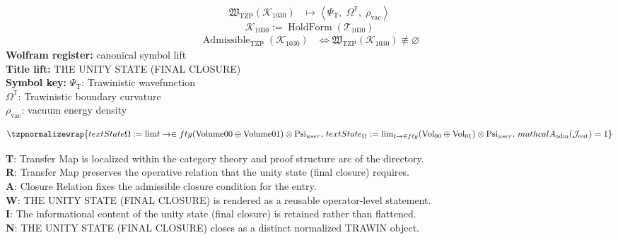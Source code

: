 \noindent
\begin{minipage}[t]{0.48\linewidth}
\begingroup
\small
\[
\begin{aligned}
\mathfrak{W}_{\mathrm{TZP}}\!\left(\mathcal{K}_{1030}\right)
&\longmapsto
\left\langle \Psi_{\mathrm{T}},\; \Omega^{\mathbb{T}},\; \rho_{\mathrm{vac}} \right\rangle
\end{aligned}
\]
\[
\mathcal{K}_{1030}
:=
\operatorname{HoldForm}\!\left(\mathcal{T}_{1030}\right)
\]
\[
\begin{aligned}
\operatorname{Admissible}_{\mathrm{TZP}}\!\left(\mathcal{K}_{1030}\right)
&\Longleftrightarrow
\mathfrak{W}_{\mathrm{TZP}}\!\left(\mathcal{K}_{1030}\right)\not\equiv\varnothing
\end{aligned}
\]
\textbf{Wolfram register:} canonical symbol lift\\
\textbf{Title lift:} THE UNITY STATE (FINAL CLOSURE)\\
\textbf{Symbol key:} \(\Psi_{\mathrm{T}}\): Trawinistic wavefunction\\ \(\Omega^{\mathbb{T}}\): Trawinistic boundary curvature\\ \(\rho_{\mathrm{vac}}\): vacuum energy density
\par
\endgroup
\end{minipage}\hfill
\begin{minipage}[t]{0.48\linewidth}
\[
\tzpnormalizewrap{text{State} {\Omega} := \mathrm{lim} {t \to \in fty} (\text{Volume} {00} \oplus \text{Volume} {01}) \otimes \mathrm{Psi}_{user},\,text{State}_{\Omega} := \mathrm{lim}_{t \to \in fty} (\text{Vol}_{00} \oplus \text{Vol}_{01}) \otimes \mathrm{Psi}_{user},\,mathcal{A}_{\mathrm{adm}}\!\left(\mathcal{J}_{\mathrm{out}}\right)=1}
\]

\small
\textbf{T}: Transfer Map is localized within the category theory and proof structure arc of the directory.\\
\textbf{R}: Transfer Map preserves the operative relation that the unity state (final closure) requires.\\
\textbf{A}: Closure Relation fixes the admissible closure condition for the entry.\\
\textbf{W}: THE UNITY STATE (FINAL CLOSURE) is rendered as a reusable operator-level statement.\\
\textbf{I}: The informational content of the unity state (final closure) is retained rather than flattened.\\
\textbf{N}: THE UNITY STATE (FINAL CLOSURE) closes as a distinct normalized TRAWIN object.
\normalsize
\end{minipage}

